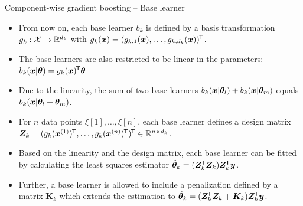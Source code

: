 \documentclass[10pt]{beamer}
\begin{document}
\begin{frame}{Component-wise gradient boosting -- Base learner}
  \begin{itemize}
    \item
      From now on, each base learner $b_k$ is defined by a basis transformation $g_k : \Xspace \to \R^{d_k}$ with $g_k(\xv) = (g_{k,1}(\xv), \dots, g_{k,d_k}(\xv))^\tran$.

    \item
      The base learners are also restricted to be linear in the parameters: $b_k(\xv | \tb) = g_k(\xv)^\tran \tb$

    \item
      Due to the linearity, the sum of two base learners $b_k(\xv | \tb_l) + b_k(\xv | \tb_m)$ equals $b_k(\xv | \tb_l + \tb_m)$.

    \item
      For $n$ data points $\xi[1], \dots, \xi[n]$, each base learner defines a design matrix $\design_k = (g_k(\xi[1])^\tran, \dots, g_k(\xi[n])^\tran)^\tran\in\R^{n\times d_k}$.

    \item
      Based on the linearity and the design matrix, each base learner can be fitted by calculating the least squares estimator $\tbh_k = (\design_\blk^\tran \design_\blk) \design_k^\tran \yv$.

    \item
      Further, a base learner is allowed to include a penalization defined by a matrix $\bm{K}_k$ which extends the estimation to $\tbh_k = (\design_\blk^\tran \design_\blk + \bm{K}_k) \design_k^\tran \yv$.

  \end{itemize}
\end{frame}
\end{document}
